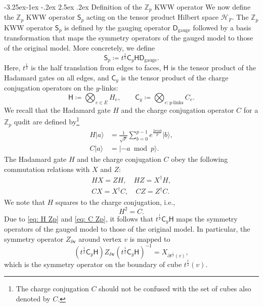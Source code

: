 \documentclass[aps,twocolumn,prx,floatfix,preprintnumbers, nofootinbib,10pt]{revtex4-2}
\makeatletter
\numberwithin{equation}{section}
\theoremstyle{definition}
\theoremstyle{remark}
\theoremstyle{claim}
\renewcommand\subsubsection{\@startsection{subsubsection}{3}{\z@}%
                                     {-3.25ex\@plus -1ex \@minus -.2ex}%
                                     {2.5ex \@plus .2ex}%
                                     {\centering\itshape\bfseries\small}}
\def\ket#1{{|{#1}\rangle}}
\makeatother
\begin{document}
\subsubsection{Definition of the $\mathbb{Z}_p$ KWW operator}
We now define the $\mathbb{Z}_p$ KWW operator $\mathsf{S}_p$ acting on the tensor product Hilbert space $\mathcal{H}_F$.
The $\mathbb{Z}_p$ KWW operator $\mathsf{S}_p$ is defined by the gauging operator $\mathsf{D}_{\mathrm{gauge}}$ followed by a basis transformation that maps the symmetry operators of the gauged model to those of the original model.
More concretely, we define
\begin{equation}
\mathsf{S}_p \coloneq t^{\frac{1}{2}} \mathsf{C}_y \mathsf{H} \mathsf{D}_{\mathrm{gauge}}.
\end{equation}
Here, $t^{\frac{1}{2}}$ is the half translation from edges to faces, $\mathsf{H}$ is the tensor product of the Hadamard gates on all edges, and $\mathsf{C}_y$ is the tensor product of the charge conjugation operators on the $y$-links:
\begin{equation}
\mathsf{H} \coloneq \bigotimes_{e \in E} H_e, \qquad
\mathsf{C}_y \coloneq \bigotimes_{e: \text{$y$-links}} C_e.
\end{equation}
We recall that the Hadamard gate $H$ and the charge conjugation operator $C$ for a $\mathbb{Z}_p$ qudit are defined by\footnote{The charge conjugation $C$ should not be confused with the set of cubes also denoted by $C$.}
\begin{align}
H \ket{a} &= \frac{1}{\sqrt{p}} \sum_{b = 0}^{p-1} e^{\frac{2\pi i ab}{p}} \ket{b}, \\
C \ket{a} &= \ket{-a \bmod p}.
\end{align}
The Hadamard gate $H$ and the charge conjugation $C$ obey the following commutation relations with $X$ and $Z$:
\begin{align}
HX = ZH, \quad
HZ = X^{\dagger} H,
\label{eq: H Zp}
\\
CX = X^{\dagger} C, \quad
CZ = Z^{\dagger} C.
\label{eq: C Zp}
\end{align}
We note that $H$ squares to the charge conjugation, i.e.,
\begin{equation}
H^2 = C.
\end{equation}
Due to \eqref{eq: H Zp} and \eqref{eq: C Zp}, it follows that $t^{\frac{1}{2}}\mathsf{C}_y\mathsf{H}$ maps the symmetry operators of the gauged model to those of the original model.
In particular, the symmetry operator $Z_{\delta \bm{v}}$ around vertex $v$ is mapped to
\begin{equation}
(t^{\frac{1}{2}} \mathsf{C}_y \mathsf{H}) Z_{\delta \bm{v}} (t^{\frac{1}{2}} \mathsf{C}_y \mathsf{H})^{-1} = X_{\partial t^{\frac{1}{2}}(v)},
\end{equation}
which is the symmetry operator on the boundary of cube $t^{\frac{1}{2}}(v)$.
\end{document}
